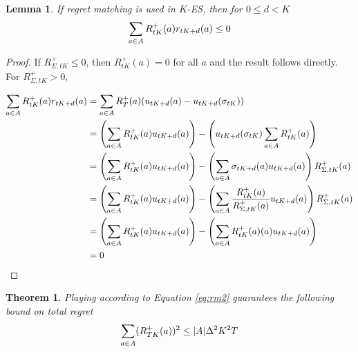 \documentclass{article}
\newtheorem{theorem}{Theorem}
\newtheorem{lemma}{Lemma}
\begin{document}
\begin{lemma}
\label{lemma:rmneg}
If regret matching is used in $K$-ES, then for $0 \leq d < K$
\begin{equation}
    \sum_{a\in A} R_{tK}^+(a) r_{tK+d}(a) \leq 0
\end{equation}
\end{lemma}

\begin{proof}
If $R_{\Sigma,{tK}}^+ \leq 0$, then $R_{tK}^+(a)=0$ for all $a$ and the result follows directly. For $R_{\Sigma,{tK}}^+ > 0$,

\begin{align}
    \sum_{a\in A} R_{tK}^+(a) r_{tK+d}(a) & = \sum_{a\in A} R_T^+(a)(u_{tK+d}(a)-u_{tK+d}(\sigma_{tK})) \\
    & = \left( \sum_{a\in A} R_{tK}^+(a) u_{tK+d}(a) \right) - 
         \left( u_{tK+d}(\sigma_{tK})\sum_{a\in A} R_{tK}^+(a) \right) \\
    & = \left( \sum_{a\in A} R_{tK}^+(a) u_{tK+d}(a) \right) - 
         \left( \sum_{a\in A} \sigma_{tK+d}(a)u_{tK+d}(a) \right) R_{{\Sigma,tK}}^+(a) \\
    & = \left( \sum_{a\in A} R_{tK}^+(a) u_{tK+d}(a) \right) - 
         \left( \sum_{a\in A} \frac{R_{tK}^+(a)}{R_{{\Sigma,tK}}^+(a)} u_{tK+d}(a) \right) R_{{\Sigma,tK}}^+(a) \\
    & = \left( \sum_{a\in A} R_{tK}^+(a) u_{tK+d}(a) \right) - 
         \left( \sum_{a\in A} R_{tK}^+(a)(a) u_{tK+d}(a) \right) \\
    & = 0
\end{align}
\end{proof} 

\begin{theorem}
\label{th:blackwell}
Playing according to Equation \ref{eq:rm2} guarantees the following bound on total regret
\begin{equation}
    \sum_{a\in A}(R_{TK}^+(a))^2 \leq |A|\Delta^2 K^2 T
\end{equation}
\end{theorem}
\end{document}
